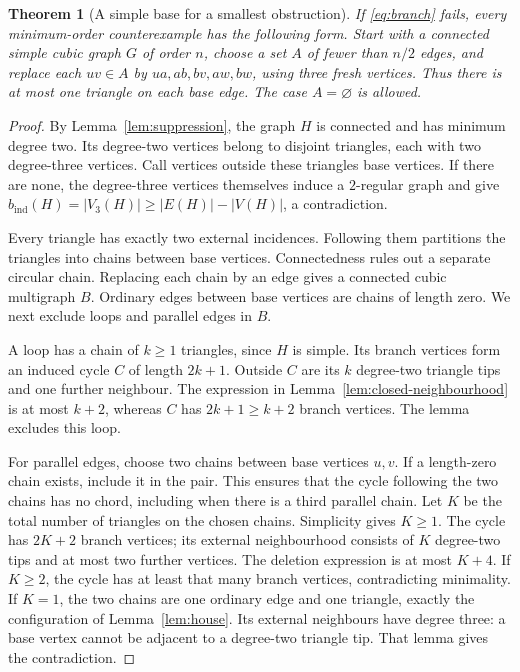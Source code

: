 \documentclass[11pt]{article}
\newtheorem{theorem}{Theorem}[section]
\newcommand{\bind}{b_{\mathrm{ind}}}
\begin{document}
\begin{theorem}[A simple base for a smallest obstruction]\label{thm:simple-base}
If \eqref{eq:branch} fails, every minimum-order counterexample has
the following form. Start with a connected simple cubic graph $G$
of order $n$, choose a set $A$ of fewer than $n/2$ edges, and replace
each $uv\in A$ by $ua,ab,bv,aw,bw$, using three fresh vertices.
Thus there is at most one triangle on each base edge. The case
$A=\varnothing$ is allowed.
\end{theorem}
\begin{proof}
By Lemma~\ref{lem:suppression}, the graph $H$ is connected and has
minimum degree two. Its degree-two vertices belong to disjoint
triangles, each with two degree-three vertices. Call vertices
outside these triangles base vertices. If there are none, the
degree-three vertices themselves induce a $2$-regular graph and
give $\bind(H)=|V_3(H)|\geq |E(H)|-|V(H)|$, a contradiction.

Every triangle has exactly two external incidences. Following them
partitions the triangles into chains between base vertices.
Connectedness rules out a separate circular chain. Replacing each
chain by an edge gives a connected cubic multigraph $B$. Ordinary
edges between base vertices are chains of length zero. We next
exclude loops and parallel edges in $B$.

A loop has a chain of $k\geq1$ triangles, since $H$ is simple.
Its branch vertices form an induced cycle $C$ of length $2k+1$.
Outside $C$ are its $k$ degree-two triangle tips and one further
neighbour. The expression in Lemma~\ref{lem:closed-neighbourhood}
is at most $k+2$, whereas $C$ has $2k+1\geq k+2$ branch vertices.
The lemma excludes this loop.

For parallel edges, choose two chains between base vertices $u,v$.
If a length-zero chain exists, include it in the pair. This ensures
that the cycle following the two chains has no chord, including
when there is a third parallel chain. Let $K$ be the total number
of triangles on the chosen chains. Simplicity gives $K\geq1$.
The cycle has $2K+2$ branch vertices; its external neighbourhood
consists of $K$ degree-two tips and at most two further vertices.
The deletion expression is at most $K+4$. If $K\geq2$, the cycle
has at least that many branch vertices, contradicting minimality.
If $K=1$, the two chains are one ordinary edge and one triangle,
exactly the configuration of Lemma~\ref{lem:house}. Its external
neighbours have degree three: a base vertex cannot be adjacent to
a degree-two triangle tip. That lemma gives the contradiction.


\end{proof}
\end{document}
